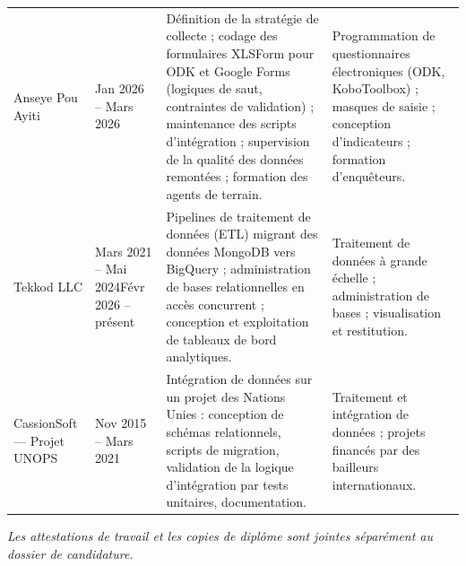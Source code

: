\documentclass[11pt,a4paper]{article}
\begin{document}
\begin{longtable}{L{3.4cm} L{2.5cm} L{5.4cm} L{5.4cm}}
Anseye Pou Ayiti
& Jan 2026 -- Mars 2026
& Définition de la stratégie de collecte ; codage des formulaires XLSForm pour ODK et Google Forms
(logiques de saut, contraintes de validation) ; maintenance des scripts d'intégration ; supervision
de la qualité des données remontées ; formation des agents de terrain.
& Programmation de questionnaires électroniques (ODK, KoboToolbox) ; masques de saisie ;
conception d'indicateurs ; formation d'enquêteurs. \\
\addlinespace

Tekkod LLC
& Mars 2021 -- Mai 2024\newline Févr 2026 -- présent
& Pipelines de traitement de données (ETL) migrant des données MongoDB vers BigQuery ;
administration de bases relationnelles en accès concurrent ; conception et exploitation de
tableaux de bord analytiques.
& Traitement de données à grande échelle ; administration de bases ; visualisation et restitution. \\
\addlinespace

CassionSoft --- Projet UNOPS
& Nov 2015 -- Mars 2021
& Intégration de données sur un projet des Nations Unies : conception de schémas relationnels,
scripts de migration, validation de la logique d'intégration par tests unitaires, documentation.
& Traitement et intégration de données ; projets financés par des bailleurs internationaux. \\
\bottomrule
\end{longtable}

\vspace{8pt}
{\small\itshape Les attestations de travail et les copies de diplôme sont jointes séparément au
dossier de candidature.}
\end{document}
